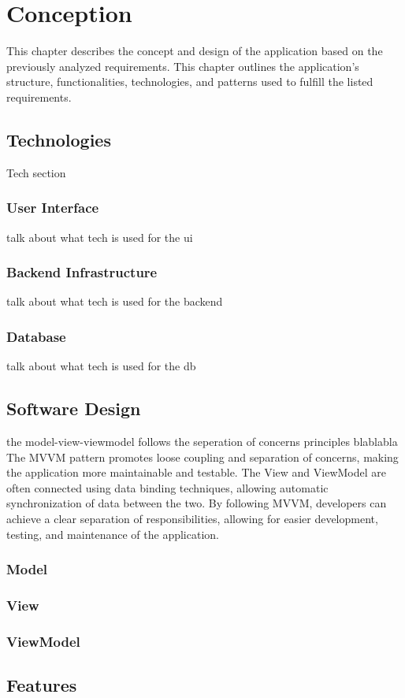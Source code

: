 \chapter{Conception}
This chapter describes the concept and design of the application based on the previously analyzed requirements. This chapter outlines the application's structure, functionalities, technologies, and patterns used to fulfill the listed requirements.





\section{Technologies}
Tech section
\subsection{User Interface}
talk about what tech is used for the ui
\subsection{Backend Infrastructure}
talk about what tech is used for the backend
\subsection{Database}
talk about what tech is used for the db


\section{Software Design}
the model-view-viewmodel follows the seperation of concerns principles blablabla
The MVVM pattern promotes loose coupling and separation of concerns, making the application more maintainable and testable. The View and ViewModel are often connected using data binding techniques, allowing automatic synchronization of data between the two.
By following MVVM, developers can achieve a clear separation of responsibilities, allowing for easier development, testing, and maintenance of the application.
\subsection{Model}
\subsection{View}
\subsection{ViewModel}

\section{Features}
